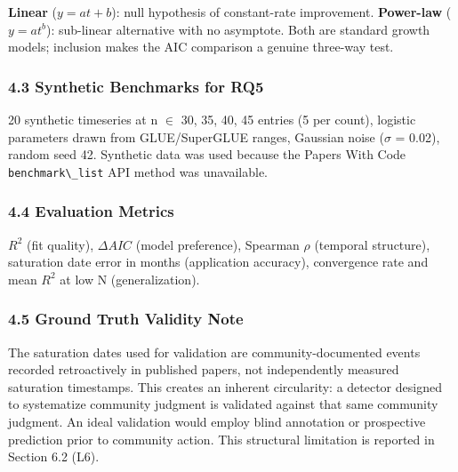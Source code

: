 \textbf{Linear} ($y = at + b$): null hypothesis of constant-rate improvement. \textbf{Power-law} ($y = at^b$): sub-linear alternative with no asymptote. Both are standard growth models; inclusion makes the AIC comparison a genuine three-way test.

\subsubsection{4.3 Synthetic Benchmarks for RQ5}

20 synthetic timeseries at n $\in$ {30, 35, 40, 45} entries (5 per count), logistic parameters drawn from GLUE/SuperGLUE ranges, Gaussian noise ($\sigma$ = 0.02), random seed 42. Synthetic data was used because the Papers With Code \texttt{benchmark\textbackslash \_list} API method was unavailable.

\subsubsection{4.4 Evaluation Metrics}

$R^2$ (fit quality), $\Delta AIC$ (model preference), Spearman $\rho$ (temporal structure), saturation date error in months (application accuracy), convergence rate and mean $R^2$ at low N (generalization).

\subsubsection{4.5 Ground Truth Validity Note}

The saturation dates used for validation are community-documented events recorded retroactively in published papers, not independently measured saturation timestamps. This creates an inherent circularity: a detector designed to systematize community judgment is validated against that same community judgment. An ideal validation would employ blind annotation or prospective prediction prior to community action. This structural limitation is reported in Section 6.2 (L6).

